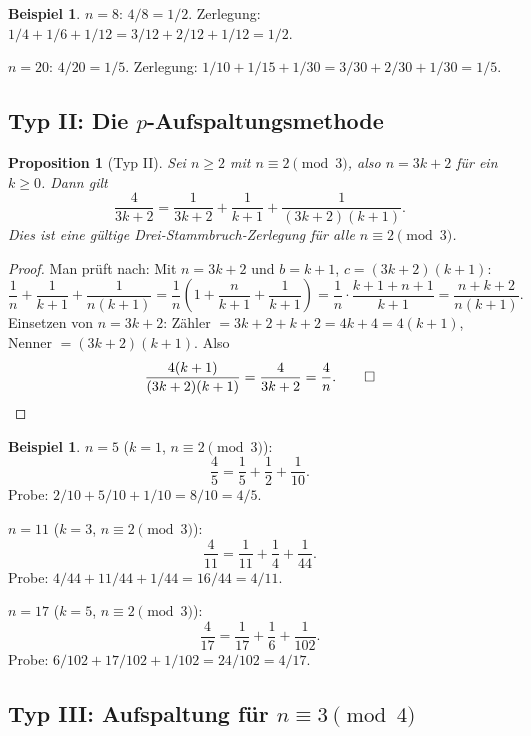 \documentclass[12pt,a4paper]{amsart}
\newtheorem{proposition}[theorem]{Proposition}
\theoremstyle{definition}
\newtheorem{example}[theorem]{Beispiel}
\begin{document}
\begin{example}
$n = 8$: $4/8 = 1/2$. Zerlegung: $1/4 + 1/6 + 1/12 = 3/12 + 2/12 + 1/12 = 1/2$. \checkmark

$n = 20$: $4/20 = 1/5$. Zerlegung: $1/10 + 1/15 + 1/30 = 3/30 + 2/30 + 1/30 = 1/5$. \checkmark
\end{example}

\subsection{Typ II: Die $p$-Aufspaltungsmethode}

\begin{proposition}[Typ II]\label{prop:typII}
Sei $n \geq 2$ mit $n \equiv 2 \pmod{3}$, also $n = 3k + 2$ für ein
$k \geq 0$.  Dann gilt
\[
  \frac{4}{3k+2} = \frac{1}{3k+2} + \frac{1}{k+1} + \frac{1}{(3k+2)(k+1)}.
\]
Dies ist eine gültige Drei-Stammbruch-Zerlegung für alle
$n \equiv 2 \pmod 3$.
\end{proposition}

\begin{proof}
Man prüft nach: Mit $n = 3k+2$ und $b = k+1$, $c = (3k+2)(k+1)$:
\[
  \frac{1}{n} + \frac{1}{k+1} + \frac{1}{n(k+1)}
  = \frac{1}{n}\left(1 + \frac{n}{k+1} + \frac{1}{k+1}\right)
  = \frac{1}{n} \cdot \frac{k+1 + n + 1}{k+1}
  = \frac{n + k + 2}{n(k+1)}.
\]
Einsetzen von $n = 3k+2$: Zähler $= 3k + 2 + k + 2 = 4k + 4 = 4(k+1)$,
Nenner $= (3k+2)(k+1)$.  Also
\[
  \frac{4(k+1)}{(3k+2)(k+1)} = \frac{4}{3k+2} = \frac{4}{n}. \qed
\]
\end{proof}

\begin{example}
$n = 5$ ($k = 1$, $n \equiv 2 \pmod 3$):
\[
  \frac{4}{5} = \frac{1}{5} + \frac{1}{2} + \frac{1}{10}.
\]
Probe: $2/10 + 5/10 + 1/10 = 8/10 = 4/5$. \checkmark

$n = 11$ ($k = 3$, $n \equiv 2 \pmod 3$):
\[
  \frac{4}{11} = \frac{1}{11} + \frac{1}{4} + \frac{1}{44}.
\]
Probe: $4/44 + 11/44 + 1/44 = 16/44 = 4/11$. \checkmark

$n = 17$ ($k = 5$, $n \equiv 2 \pmod 3$):
\[
  \frac{4}{17} = \frac{1}{17} + \frac{1}{6} + \frac{1}{102}.
\]
Probe: $6/102 + 17/102 + 1/102 = 24/102 = 4/17$. \checkmark
\end{example}

\subsection{Typ III: Aufspaltung für $n \equiv 3 \pmod 4$}
\end{document}
